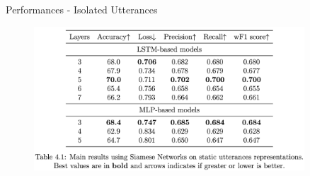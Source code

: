 \documentclass[11pt,aspectratio=169]{beamer}
\begin{document}
    \begin{frame}{Performances - Isolated Utterances}
        \begin{figure}
            \centering
            \includegraphics[width=0.9\textwidth]{figures/results_static_only.png}
            \label{fig:results_static}
        \end{figure}
    \end{frame}
\end{document}
